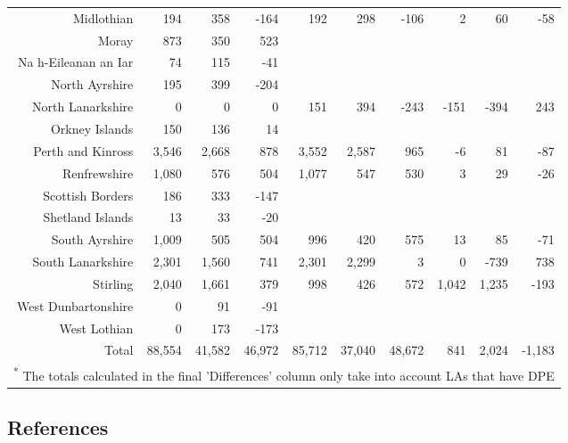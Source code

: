 \documentclass[
  12pt,
]{article}
\begin{document}
\begin{landscape}
\begin{table}[H]
\begin{tabular}[t]{rrrrrrrrrr}
Midlothian & 194 & 358 & -164 & 192 & 298 & -106 & 2 & 60 & -58\\
Moray & 873 & 350 & 523 &  &  &  &  &  & \\
Na h-Eileanan an Iar & 74 & 115 & -41 &  &  &  &  &  & \\
North Ayrshire & 195 & 399 & -204 &  &  &  &  &  & \\
North Lanarkshire & 0 & 0 & 0 & 151 & 394 & -243 & -151 & -394 & 243\\
Orkney Islands & 150 & 136 & 14 &  &  &  &  &  & \\
Perth and Kinross & 3,546 & 2,668 & 878 & 3,552 & 2,587 & 965 & -6 & 81 & -87\\
Renfrewshire & 1,080 & 576 & 504 & 1,077 & 547 & 530 & 3 & 29 & -26\\
Scottish Borders & 186 & 333 & -147 &  &  &  &  &  & \\
Shetland Islands & 13 & 33 & -20 &  &  &  &  &  & \\
South Ayrshire & 1,009 & 505 & 504 & 996 & 420 & 575 & 13 & 85 & -71\\
South Lanarkshire & 2,301 & 1,560 & 741 & 2,301 & 2,299 & 3 & 0 & -739 & 738\\
Stirling & 2,040 & 1,661 & 379 & 998 & 426 & 572 & 1,042 & 1,235 & -193\\
West Dunbartonshire & 0 & 91 & -91 &  &  &  &  &  & \\
West Lothian & 0 & 173 & -173 &  &  &  &  &  & \\
\midrule
Total & 88,554 & 41,582 & 46,972 & 85,712 & 37,040 & 48,672 & 841 & 2,024 & -1,183\\
\bottomrule
\multicolumn{10}{l}{\rule{0pt}{1em}\textsuperscript{*} The totals calculated in the final 'Differences' column only take into account LAs that have DPE}\\
\end{tabular}
\end{table}
\end{landscape}

\hypertarget{references}{%
\subsection*{References}\label{references}}
\end{document}
